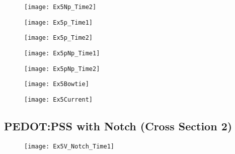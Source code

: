 \begin{landscape}
\begin{figure}[!htp]
\centering
\texttt{[image: Ex5Np\_Time2]}
\caption{} 
\label{}
\end{figure}
\end{landscape}

\begin{landscape}
\begin{figure}[!htp]
\centering
\texttt{[image: Ex5p\_Time1]}
\caption{} 
\label{}
\end{figure}
\end{landscape}

\begin{landscape}
\begin{figure}[!htp]
\centering
\texttt{[image: Ex5p\_Time2]}
\caption{} 
\label{}
\end{figure}
\end{landscape}


\begin{landscape}
\begin{figure}[!htp]
\centering
\texttt{[image: Ex5pNp\_Time1]}
\caption{} 
\label{}
\end{figure}
\end{landscape}

\begin{landscape}
\begin{figure}[!htp]
\centering
\texttt{[image: Ex5pNp\_Time2]}
\caption{} 
\label{}
\end{figure}
\end{landscape}


\begin{figure}[!htp]
\centering
\texttt{[image: Ex5Bowtie]}
\caption{} 
\label{}
\end{figure}

\begin{figure}[!htp]
\centering
\texttt{[image: Ex5Current]}
\caption{} 
\label{}
\end{figure}



\clearpage
\subsection{PEDOT:PSS with Notch (Cross Section 2)}


\begin{landscape}
\begin{figure}[!htp]
\centering
\texttt{[image: Ex5V\_Notch\_Time1]}
\caption{} 
\label{}
\end{figure}
\end{landscape}

